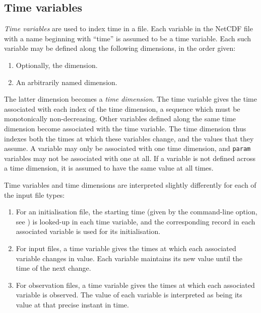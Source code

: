 \subsection{Time variables\label{Time_variables}}

\emph{Time variables} are used to index time in a file. Each variable in the
NetCDF file with a name beginning with ``time'' is assumed to be a time
variable. Each such variable may be defined along the following dimensions, in
the order given:
\begin{enumerate}
\item Optionally, the  dimension.
\item An arbitrarily named dimension.
\end{enumerate}
The latter dimension becomes a \emph{time
  dimension}. The time variable gives the time
associated with each index of the time dimension, a sequence which must be
monotonically non-decreasing. Other variables defined along the same time
dimension become associated with the time variable. The time dimension thus
indexes both the times at which these variables change, and the values that
they assume. A variable may only be associated with one time dimension, and
\texttt{param} variables may not be associated with one at all. If a variable
is not defined across a time dimension, it is assumed to have the same value
at all times.

Time variables and time dimensions are interpreted slightly differently for
each of the input file types:
\begin{enumerate}
\item For an initialisation file, the starting time (given by the 
  command-line option, see ) is looked-up in each time
  variable, and the corresponding record in each associated variable is used
  for its initialisation.
\item For input files, a time variable gives the times at which each
  associated variable changes in value. Each variable maintains its new
  value until the time of the next change.
\item For observation files, a time variable gives the times at which each
  associated variable is observed. The value of each variable is interpreted
  as being its value at that precise instant in time.
\end{enumerate}

